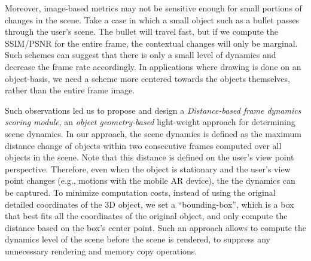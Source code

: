 Moreover, image-based metrics may not be sensitive enough for small portions
of changes in the scene. Take a case in which a small object such as a bullet
passes through the user's scene. The bullet will travel fast, but if we compute 
the SSIM/PSNR for the entire frame, the contextual changes will only be marginal. 
Such schemes can suggest that there is
only a small level of dynamics and decrease the frame rate accordingly. In 
applications where drawing is done on an object-basis, we need a scheme 
more centered towards the objects themselves, rather than the entire frame image. 



Such observations led us to propose and design a \emph{Distance-based frame 
dynamics scoring module}, an \emph{object geometry-based} light-weight approach 
for determining scene dynamics.
%
In our approach, the scene dynamics is defined as the maximum distance change of 
objects within two consecutive frames computed over all objects in the scene. Note
that this distance is defined 
on the user's view point perspective.
Therefore, even when the object is stationary and the user's view point changes 
(e.g., motions with the mobile AR device), the the dynamics can be captured.
%
To minimize computation costs, instead of using the original detailed coordinates 
of the 3D object, we set a ``bounding-box'', which is a box that best fits all the 
coordinates of the original object, and only compute the distance based on the 
box's center point. 
%
Such an approach allows {\myit} to compute the dynamics level of the scene 
before the scene is rendered, to suppress any unnecessary rendering and memory 
copy operations.

%



